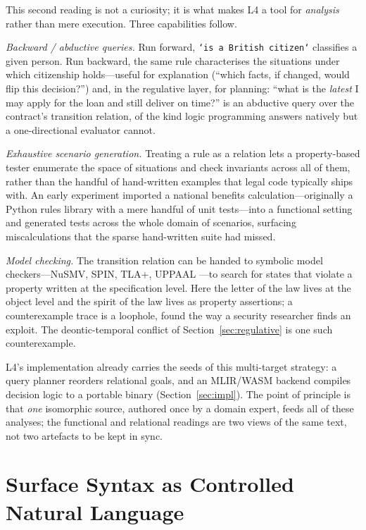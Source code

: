 \documentclass[sigconf,nonacm]{acmart}
\newcommand{\code}[1]{\texttt{\small #1}}
\begin{document}
This second reading is not a curiosity; it is what makes L4 a tool for
\emph{analysis} rather than mere execution. Three capabilities follow.

\emph{Backward / abductive queries.} Run forward, \code{`is a British
citizen`} classifies a given person. Run backward, the same rule
characterises the situations under which citizenship holds---useful for
explanation (``which facts, if changed, would flip this decision?'') and,
in the regulative layer, for planning: ``what is the \emph{latest} I may
apply for the loan and still deliver on time?'' is an abductive query over
the contract's transition relation, of the kind logic programming answers
natively but a one-directional evaluator cannot.

\emph{Exhaustive scenario generation.} Treating a rule as a relation lets a
property-based tester enumerate the space of situations and check
invariants across all of them, rather than the handful of hand-written
examples that legal code typically ships with. An early experiment imported
a national benefits calculation---originally a Python rules library with a
mere handful of unit tests---into a functional setting and generated tests
across the whole domain of scenarios, surfacing miscalculations that the
sparse hand-written suite had missed.

\emph{Model checking.} The transition relation can be handed to symbolic
model checkers---NuSMV, SPIN, TLA+, UPPAAL
\cite{cimatti2002nusmv,holzmann1997spin,lamport2002specifying,behrmann2004uppaal}---to
search for states that violate a property written at the specification
level. Here the letter of the law lives at the object level and the spirit
of the law lives as property assertions; a counterexample trace is a
loophole, found the way a security researcher finds an exploit. The
deontic-temporal conflict of Section~\ref{sec:regulative} is one such
counterexample.

L4's implementation already carries the seeds of this multi-target
strategy: a query planner reorders relational goals, and an MLIR/WASM
backend compiles decision logic to a portable binary
(Section~\ref{sec:impl}). The point of principle is that \emph{one}
isomorphic source, authored once by a domain expert, feeds all of these
analyses; the functional and relational readings are two views of the same
text, not two artefacts to be kept in sync.

\section{Surface Syntax as Controlled Natural Language}\label{sec:cnl}
\end{document}
